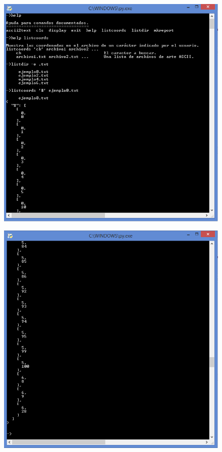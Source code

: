 \documentclass[a4paper,12pt]{article}
\begin{document}
\clearpage
\begin{figure}[htbp]
    \begin{adjustbox}{max width=\textwidth, center}
        \includegraphics{C4/S5_C4.PNG}
    \end{adjustbox}
\end{figure}
\begin{figure}[htbp]
    \begin{adjustbox}{max width=\textwidth, center}
        \includegraphics{C4/S6_C4.PNG}
    \end{adjustbox}
\end{figure}
\end{document}
